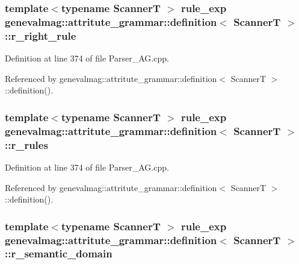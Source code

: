 \hypertarget{structgenevalmag_1_1attritute__grammar_1_1definition_a7c9d5ea66aaf2f84b0a91c0c33c1fe24}{
\subsubsection[{r\_\-right\_\-rule}]{\setlength{\rightskip}{0pt plus 5cm}template$<$typename ScannerT $>$ {\bf rule\_\-exp} {\bf genevalmag::attritute\_\-grammar::definition}$<$ ScannerT $>$::{\bf r\_\-right\_\-rule}}}
\label{structgenevalmag_1_1attritute__grammar_1_1definition_a7c9d5ea66aaf2f84b0a91c0c33c1fe24}


Definition at line 374 of file Parser\_\-AG.cpp.



Referenced by genevalmag::attritute\_\-grammar::definition$<$ ScannerT $>$::definition().

\hypertarget{structgenevalmag_1_1attritute__grammar_1_1definition_a25d876ebeb9dab6244b8c0cd102ab3de}{
\subsubsection[{r\_\-rules}]{\setlength{\rightskip}{0pt plus 5cm}template$<$typename ScannerT $>$ {\bf rule\_\-exp} {\bf genevalmag::attritute\_\-grammar::definition}$<$ ScannerT $>$::{\bf r\_\-rules}}}
\label{structgenevalmag_1_1attritute__grammar_1_1definition_a25d876ebeb9dab6244b8c0cd102ab3de}


Definition at line 374 of file Parser\_\-AG.cpp.



Referenced by genevalmag::attritute\_\-grammar::definition$<$ ScannerT $>$::definition().

\hypertarget{structgenevalmag_1_1attritute__grammar_1_1definition_a9ea576ee1b0ec26c4f6ea706b51a6f96}{
\subsubsection[{r\_\-semantic\_\-domain}]{\setlength{\rightskip}{0pt plus 5cm}template$<$typename ScannerT $>$ {\bf rule\_\-exp} {\bf genevalmag::attritute\_\-grammar::definition}$<$ ScannerT $>$::{\bf r\_\-semantic\_\-domain}}}
\label{structgenevalmag_1_1attritute__grammar_1_1definition_a9ea576ee1b0ec26c4f6ea706b51a6f96}


